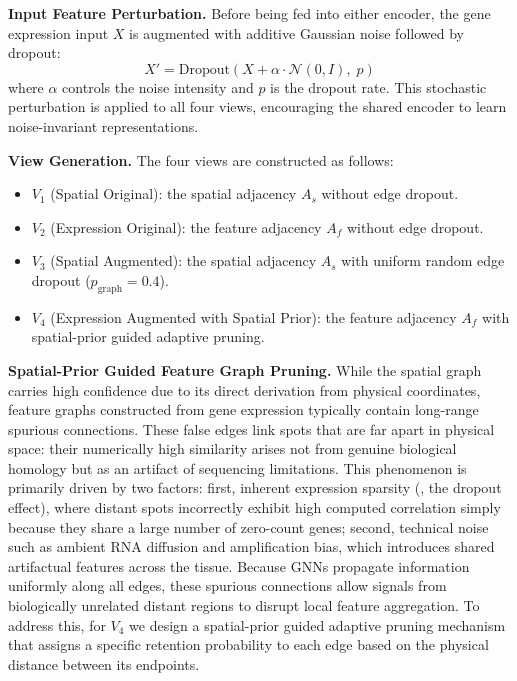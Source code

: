 \documentclass[lettersize,journal]{IEEEtran}
\begin{document}
\textbf{Input Feature Perturbation.}
Before being fed into either encoder, the gene expression input $X$ is augmented with additive Gaussian noise followed by dropout:
\begin{equation}
    X' = \text{Dropout}\left(X + \alpha \cdot \mathcal{N}(0, I),\; p\right)
\end{equation}
where $\alpha$ controls the noise intensity and $p$ is the dropout rate. This stochastic perturbation is applied to all four views, encouraging the shared encoder to learn noise-invariant representations.

\textbf{View Generation.}
The four views are constructed as follows:
\begin{itemize}
    \item $V_1$ (Spatial Original): the spatial adjacency $A_s$ without edge dropout.
    \item $V_2$ (Expression Original): the feature adjacency $A_f$ without edge dropout.
    \item $V_3$ (Spatial Augmented): the spatial adjacency $A_s$ with uniform random edge dropout ($p_{\text{graph}}=0.4$).
    \item $V_4$ (Expression Augmented with Spatial Prior): the feature adjacency $A_f$ with spatial-prior guided adaptive pruning.
\end{itemize}

\textbf{Spatial-Prior Guided Feature Graph Pruning.}
While the spatial graph carries high confidence due to its direct derivation from physical coordinates, feature graphs constructed from gene expression typically contain long-range spurious connections. These false edges link spots that are far apart in physical space: their numerically high similarity arises not from genuine biological homology but as an artifact of sequencing limitations. This phenomenon is primarily driven by two factors: first, inherent expression sparsity (\ie, the dropout effect), where distant spots incorrectly exhibit high computed correlation simply because they share a large number of zero-count genes; second, technical noise such as ambient RNA diffusion and amplification bias, which introduces shared artifactual features across the tissue. Because GNNs propagate information uniformly along all edges, these spurious connections allow signals from biologically unrelated distant regions to disrupt local feature aggregation. To address this, for $V_4$ we design a spatial-prior guided adaptive pruning mechanism that assigns a specific retention probability to each edge based on the physical distance between its endpoints.
\end{document}
